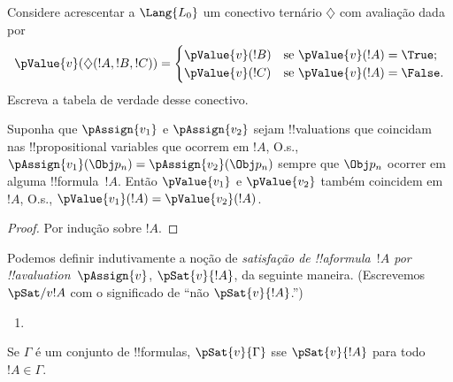 \documentclass[../../../include/open-logic-section]{subfiles}
\begin{document}
\begin{prob}
Considere acrescentar a $\Lang{L_0}$ um conectivo ternário $\diamondsuit$
com avaliação dada por
\begin{gather*}
  \pValue{v}(\diamondsuit( !A , !B , !C ) ) = \begin{cases}
    \pValue{v}( !B ) &
    \text{se $\pValue{v}(!A) = \True$;}\\
    \pValue{v}( !C ) &
    \text{se $\pValue{v}(!A) = \False $}.
  \end{cases}
\end{gather*}
Escreva a tabela de verdade desse conectivo.
\end{prob}

\begin{thm}
 Suponha que $\pAssign{v_1}$ e
$\pAssign{v_2}$ sejam !!{valuation}s que coincidam nas !!{propositional
variable}s que ocorrem em $!A$, O.s.\@, $\pAssign{v_1}(\Obj p_n) =
\pAssign{v_2}(\Obj p_n)$ sempre que $\Obj p_n$ ocorrer em alguma
!!{formula}~$!A$. Então $\pValue{v_1}$ e $\pValue{v_2}$ também coincidem
em~$!A$, O.s.\@, $\pValue{v_1}(!A) = \pValue{v_2}(!A)$.
\end{thm}

\begin{proof}
Por indução sobre $!A$.
\end{proof}

\begin{defn}[Satisfação]
 Podemos definir indutivamente a noção de
  \emph{satisfação de !!a{formula}~$!A$ por
  !!a{valuation}~$\pAssign{v}$}, $\pSat{v}{!A}$, da seguinte maneira.
  (Escrevemos $\pSat/{v}{!A}$ com o significado de ``não $\pSat{v}{!A}$.'')
\begin{enumerate}


\item {}





\end{enumerate}
Se $\Gamma$ é um conjunto de !!{formula}s, $\pSat{v}{\Gamma}$ sse
$\pSat{v}{!A}$ para todo~$!A \in \Gamma$.
\end{defn}
\end{document}
